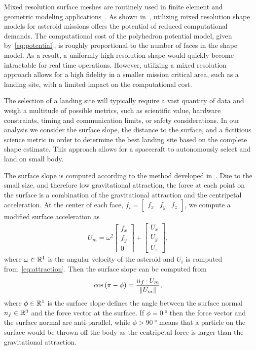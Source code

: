 Mixed resolution surface meshes are routinely used in finite element and geometric modeling applications~\cite{botsch2010}.
As shown in~\cite{mcmahon2017}, utilizing mixed resolution shape models for asteroid missions offers the potential of reduced computational demands.
The computational cost of the polyhedron potential model, given by~\cref{eq:potential}, is roughly proportional to the number of faces in the shape model.
As a result, a uniformly high resolution shape would quickly become intractable for real time operations.
However, utilizing a mixed resolution approach allows for a high fidelity in a smaller mission critical area, such as a landing site, with a limited impact on the computational cost.

The selection of a landing site will typically require a vast quantity of data and weigh a multitude of possible metrics, such as scientific value, hardware constraints, timing and communication limits, or safety considerations. 
In our analysis we consider the surface slope, the distance to the surface, and a fictitious science metric in order to determine the best landing site based on the complete shape estimate.
This approach allows for a spacecraft to autonomously select and land on small body.

The surface slope is computed according to the method developed in~\cite{scheeres1996}.
Due to the small size, and therefore low gravitational attraction, the force at each point on the surface is a combination of the gravitational attraction and the centripetal acceleration.
At the center of each face, \( f_i = \begin{bmatrix} f_x & f_y & f_z \end{bmatrix} \), we compute a modified surface acceleration as
\begin{align}\label{eq:surface_force}
    U_m = \omega^2 \begin{bmatrix} f_x \\ f_y \\ 0 \end{bmatrix} + \begin{bmatrix} U_x \\ U_y \\ U_z \end{bmatrix},
\end{align}
where \( \omega \in \mathbb{R}^1 \) is the angular velocity of the asteroid and \( U_i \) is computed from~\cref{eq:attraction}.
Then the surface slope can be computed from
\begin{align}\label{eq:surface_slope}
    \cos \left(  \pi - \phi  \right) = \frac{n_f \cdot U_m}{\left\| U_m \right\|},
\end{align}
where \( \phi \in \mathbb{R}^1 \) is the surface slope defines the angle between the surface normal \( n_f \in \mathbb{R}^3 \) and the force vector at the surface.
If \( \phi = \SI{0}{\degree} \) then the force vector and the surface normal are anti-parallel, while \( \phi > \SI{90}{\degree} \) means that a particle on the surface would be thrown off the body as the centripetal force is larger than the gravitational attraction.

